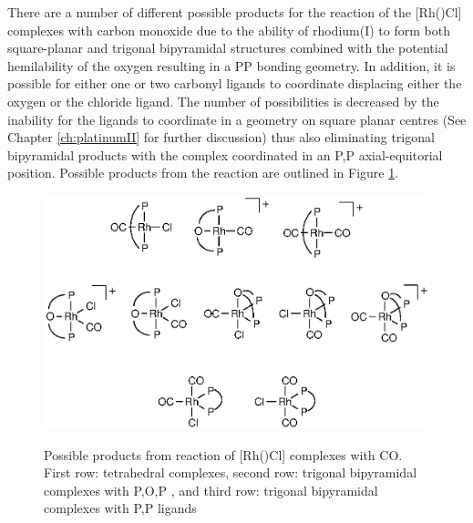 
There are a number of different possible products for the reaction of the [Rh(\tBuxantphosk)Cl] complexes with carbon monoxide due to the ability of rhodium(I) to form both square-planar and trigonal bipyramidal structures combined with the potential hemilability of the \tBuxantphos{} oxygen resulting in a \dento{}PP\textprime{} bonding geometry.  In addition, it is possible for either one or two carbonyl ligands to coordinate displacing either the oxygen or the chloride ligand.  The number of possibilities is decreased by the inability for the \tBuxantphos{} ligands to coordinate in a \cis{} geometry on square planar centres (See Chapter \ref{ch:platinumII} for further discussion) thus also eliminating trigonal bipyramidal products with the \tBuxantphos{} complex coordinated in an \dento{}P,P\textprime{} axial-equitorial position.  Possible products from the reaction are outlined in Figure \ref{RhCOpossibilities}.

\begin{figure}[htb]
\begin{center}
\vspace{0.5cm}
\includegraphics{../Figures/RhCOpossibilities.eps}
\caption[Possible products from reaction of \texorpdfstring{[Rh(\tBuxantphosk)Cl{]} complexes with CO} R]{Possible products from reaction of \texorpdfstring{[Rh(\tBuxantphosk)Cl] complexes with CO} R.  First row: tetrahedral complexes, second row: trigonal bipyramidal complexes with \dento{}P,O,P\textprime{} \tBuxantphos{}, and third row: trigonal bipyramidal complexes with \dento{}P,P\textprime{} \tBuxantphos{} ligands}
\vspace{0.2cm}
\label{RhCOpossibilities}
\end{center}
\end{figure}
\vspace{0.2cm}

